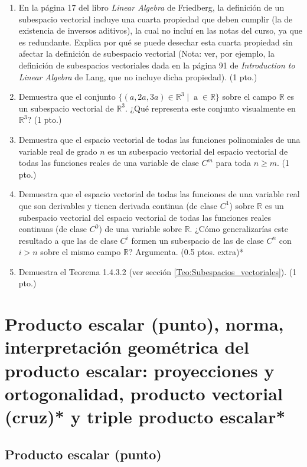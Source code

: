 \documentclass[12pt]{article}
\begin{document}
\begin{enumerate}
    \item En la página 17 del libro \textit{Linear Algebra} de Friedberg, la definición de un subespacio vectorial incluye una cuarta propiedad que deben cumplir (la de existencia de inversos aditivos), la cual no incluí en las notas del curso, ya que es redundante. Explica por qué se puede desechar esta cuarta propiedad sin afectar la definición de subespacio vectorial (Nota: ver, por ejemplo, la definición de subespacios vectoriales dada en la página 91 de \textit{Introduction to Linear Algebra} de Lang, que no incluye dicha propiedad). (1 pto.)
    \item Demuestra que el conjunto $\{(a,2a,3a)\in\mathbb{R}^3\mathop|\mathop a\in\mathbb{R}\}$ sobre el campo $\mathbb{R}$ es un subespacio vectorial de $\mathbb{R}^3$. ¿Qué representa este conjunto visualmente en $\mathbb{R}^3$? (1 pto.)
    \item Demuestra que el espacio vectorial de todas las funciones polinomiales de una variable real de grado $n$ es un subespacio vectorial del espacio vectorial de todas las funciones reales de una variable de clase $C^m$ para toda $n \geq m$. (1 pto.)
    \item Demuestra que el espacio vectorial de todas las funciones de una variable real que son derivables y tienen derivada continua (de clase $C^1$) sobre $\mathbb{R}$ es un subespacio vectorial del espacio vectorial de todas las funciones reales continuas (de clase $C^0$) de una variable sobre $\mathbb{R}$. ¿Cómo generalizarías este resultado a que las de clase $C^i$ formen un subespacio de las de clase $C^n$ con $i>n$ sobre el mismo campo $\mathbb{R}$? Argumenta. (0.5 ptos. extra)*
    \item Demuestra el Teorema 1.4.3.2 (ver sección \ref{Teo:Subespacios_vectoriales}). (1 pto.)
\end{enumerate}


\newpage
\section{Producto escalar (punto), norma, interpretación geométrica del producto escalar: proyecciones y ortogonalidad, producto vectorial (cruz)* y triple producto escalar*} \label{Sec:2}

\subsection{Producto escalar (punto)}
\end{document}
